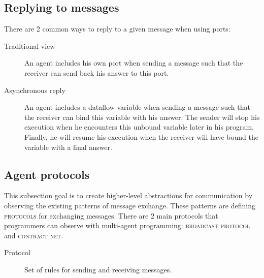 \documentclass[11pt,a4paper,twoside,openright]{report}
\begin{document}
\subsection{Replying to messages}

There are 2 common ways to reply to a given message when using ports:

\begin{description}
	\item[Traditional view] An agent includes his own port when sending a 
message such that the receiver can send back his answer to this port.
	\item[Asynchronous reply] An agent includes a dataflow variable when 
sending a message such that the receiver can bind this variable with his 
answer. 
The sender will stop his execution when he encounters this unbound variable 
later in his program. Finally, he will resume his execution when the receiver 
will have bound the variable with a final answer.
\end{description}

\subsection{Agent protocols}

This subsection goal is to create higher-level abstractions for communication 
by observing the existing patterns of message exchange. These patterns are 
defining \textsc{protocols} for exchanging messages. There are 2 main protocols 
that programmers can observe with multi-agent programming: \textsc{broadcast 
protocol} and \textsc{contract net}.

\begin{description}
 \item[Protocol] Set of rules for sending and receiving messages.
\end{description}
\end{document}
